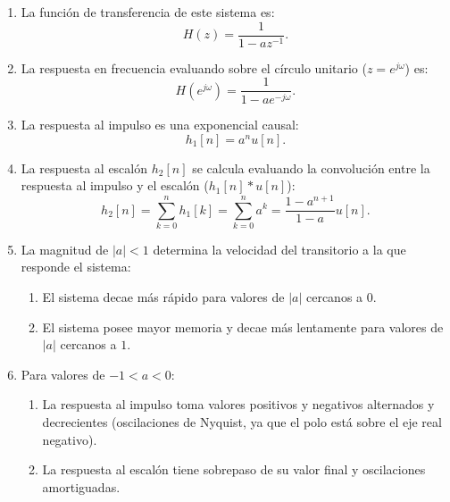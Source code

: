 \documentclass[11pt,a4paper,openany]{book}
\begin{document}
\begin{enumerate}
	\item La funci\'{o}n de transferencia de este sistema es:
	\begin{equation}
		H(z) = \frac{1}{1 - a z^{-1}}.
	\end{equation}
	
	\item La respuesta en frecuencia evaluando sobre el círculo unitario ($z = e^{j\omega}$) es:
	\begin{equation}
		H(e^{j\omega}) = \frac{1}{1 - a e^{-j\omega}}.
	\end{equation}
	
	\item La respuesta al impulso es una exponencial causal:
	\begin{equation}
		h_{1}[n] = a^{n} u[n].
	\end{equation}
	
	\item La respuesta al escal\'{o}n $h_{2}[n]$ se calcula evaluando la convoluci\'{o}n entre la respuesta al impulso y el escalón ($h_{1}[n] * u[n]$):
	\begin{equation}
		h_{2}[n] = \sum_{k=0}^{n} h_{1}[k] = \sum_{k=0}^{n} a^k = \frac{1 - a^{n+1}}{1 - a} u[n].
	\end{equation}
	
	\item La magnitud de $|a| < 1$ determina la velocidad del transitorio a la que responde el sistema:
	\begin{enumerate}
		\item El sistema decae m\'{a}s r\'{a}pido para valores de $|a|$ cercanos a $0$.
		\item El sistema posee mayor memoria y decae m\'{a}s lentamente para valores de $|a|$ cercanos a $1$.
	\end{enumerate}
	
	\item Para valores de $-1 < a < 0$:
	\begin{enumerate}
		\item La respuesta al impulso toma valores positivos y negativos alternados y decrecientes (oscilaciones de Nyquist, ya que el polo está sobre el eje real negativo).
		\item La respuesta al escal\'{o}n tiene sobrepaso de su valor final y oscilaciones amortiguadas.
	\end{enumerate}
	

\end{enumerate}
\end{document}

